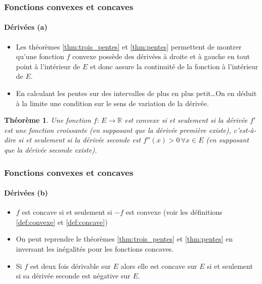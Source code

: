 \documentclass[10pt,notheorems]{beamer}
\theoremstyle{plain}
\newtheorem{theorem}{Théorème}
\theoremstyle{definition} %
\begin{document}
\begin{frame}
  \frametitle{Fonctions convexes et concaves}
  \framesubtitle{Dérivées (a)}
  \hypertarget{slide_fonctions_convexes_6}{}

  \begin{itemize}

  \item Les théorèmes \hyperlink{slide_fonctions_convexes_3}{\ref{thm:trois_pentes}} et \hyperlink{slide_fonctions_convexes_5}{\ref{thm:pentes}} permettent de montrer qu'une fonction $f$ convexe possède des dérivées à droite et à gauche en tout point à l'intérieur de $E$ et donc assure la continuité de la fonction à l'intérieur de $E$.\newline

  \item En calculant les pentes sur des intervalles de plus en plus petit\ldots On en déduit à la limite une condition sur le sens de variation de la dérivée.\newline

  \end{itemize}

  \begin{theorem}
    Une fonction $f:\, E\rightarrow \mathbb R$ est convexe si et seulement si la dérivée $f'$ est une fonction croissante (en supposant que la dérivée première existe), c'est-à-dire si et seulement si la dérivée seconde est $f''(x)>0\,\forall x\in E$ (en supposant que la dérivée seconde existe).
  \end{theorem}

\end{frame}


\begin{frame}
  \frametitle{Fonctions convexes et concaves}
  \framesubtitle{Dérivées (b)}
  \hypertarget{slide_fonctions_convexes_7}{}

  \begin{itemize}

  \item $f$ est concave si et seulement si $-f$ est convexe (voir les définitions \hyperlink{slide_fonctions_convexes_1}{\ref{def:convexe}} et \hyperlink{slide_fonctions_convexes_1}{\ref{def:concave}})\newline

  \item On peut reprendre le théorèmes \hyperlink{slide_fonctions_convexes_3}{\ref{thm:trois_pentes}} et \hyperlink{slide_fonctions_convexes_5}{\ref{thm:pentes}} en inversant les inégalités pour les fonctions concaves.\newline

  \item Si $f$ est deux fois dérivable sur $E$ alors elle est concave sur $E$ si et seulement si sa dérivée seconde est négative sur $E$.\newline

  \end{itemize}

\end{frame}
\end{document}
